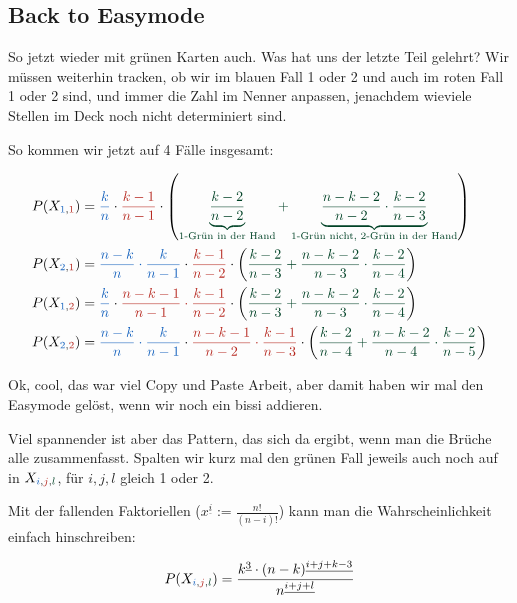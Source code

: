 \documentclass[../main.tex]{subfiles}
\begin{document}
\subsection{Back to Easymode}

So jetzt wieder mit grünen Karten auch. Was hat uns der letzte Teil gelehrt? Wir müssen weiterhin tracken, ob wir im blauen Fall 1 oder 2 und auch im roten Fall 1 oder 2 sind, und immer die Zahl im Nenner anpassen, jenachdem wieviele Stellen im Deck noch nicht determiniert sind.

So kommen wir jetzt auf 4 Fälle insgesamt:

\begin{align*}
     P(X_{\blue 1, \red 1}) &= \blue{\frac{k}{n}} \cdot \red{\frac{k-1}{n-1}} \cdot \left( \green{\underbrace{\frac{k-2}{n-2}}_\text{1-Grün in der Hand} + \underbrace{\frac{n-k-2}{n-2} \cdot \frac{k-2}{n-3}}_\text{1-Grün nicht, 2-Grün in der Hand}}\right) \\
     P(X_{\blue 2, \red 1}) &= \blue{\frac{n-k}{n}\cdot\frac{k}{n-1}} \cdot \red{\frac{k-1}{n-2}} \cdot \left( \green{\frac{k-2}{n-3} + \frac{n-k-2}{n-3} \cdot \frac{k-2}{n-4}}\right) \\
     P(X_{\blue 1, \red 2}) &= \blue{\frac{k}{n}} \cdot \red{\frac{n-k-1}{n-1} \cdot \frac{k-1}{n-2}} \cdot \left( \green{\frac{k-2}{n-3} + \frac{n-k-2}{n-3} \cdot \frac{k-2}{n-4}}\right) \\
     P(X_{\blue 2, \red 2}) &= \blue{\frac{n-k}{n}\cdot\frac{k}{n-1}} \cdot \red{\frac{n-k-1}{n-2} \cdot \frac{k-1}{n-3}} \cdot \left( \green{\frac{k-2}{n-4} + \frac{n-k-2}{n-4} \cdot \frac{k-2}{n-5}}\right)
\end{align*}

Ok, cool, das war viel Copy und Paste Arbeit, aber damit haben wir mal den Easymode gelöst, wenn wir noch ein bissi addieren.

Viel spannender ist aber das Pattern, das sich da ergibt, wenn man die Brüche alle zusammenfasst. Spalten wir kurz mal den grünen Fall jeweils auch noch auf in $X_{\blue i, \red j, \green l}$, für $i, j, l$ gleich 1 oder 2.

Mit der fallenden Faktoriellen ($x^{\underline{i}} := \frac{n!}{(n-i)!}$) kann man die Wahrscheinlichkeit einfach hinschreiben:

\begin{equation*}
    P(X_{\blue i, \red j, \green l}) = \frac{k^{\underline{3}} \cdot (n-k)^{\underline{i+j+k-3}}}{n^{\underline{i+j+l}}}
\end{equation*}
\end{document}
